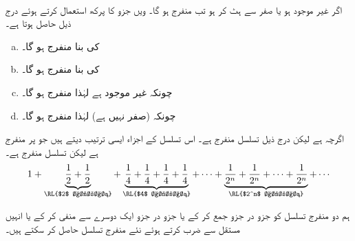\\
اگر  غیر موجود ہو یا صفر سے ہٹ کر ہو تب  منفرج ہو گا۔
 ویں جزو کا پرکھ استعمال کرتے ہوئے درج ذیل حاصل ہوتا ہے۔
\begin{enumerate}[a.]
\item
{} کی بنا  منفرج ہو گا۔
\item
{} کی بنا  منفرج ہو گا۔
\item
چونکہ  غیر موجود ہے لہٰذا  منفرج ہو گا۔
\item
چونکہ (صفر نہیں ہے) لہٰذا  منفرج ہو گا۔
\end{enumerate}
اگرچہ  ہے لیکن درج ذیل تسلسل منفرج ہے۔ اس تسلسل کے اجزاء ایسی ترتیب دیتے ہیں جو  پر منفرج ہے لیکن تسلسل منفرج ہے۔
\begin{align*}
1+\underbrace{\frac{1}{2}+\frac{1}{2}}_{\text{\RL{$2$ اجزاء}}}+\underbrace{\frac{1}{4}+\frac{1}{4}+\frac{1}{4}+\frac{1}{4}}_{\text{\RL{$4$ اجزاء}}}+\cdots+\underbrace{\frac{1}{2^n}+\frac{1}{2^n}+\cdots+\frac{1}{2^n}}_{\text{\RL{$2^n$ اجزاء}}}+\cdots
\end{align*}

ہم دو منفرج تسلسل کو جزو در جزو جمع کر کے یا  جزو در جزو ایک دوسرے سے منفی کر کے یا انہیں مستقل سے ضرب کرتے ہوئے نئے منفرج تسلسل حاصل کر سکتے ہیں۔

